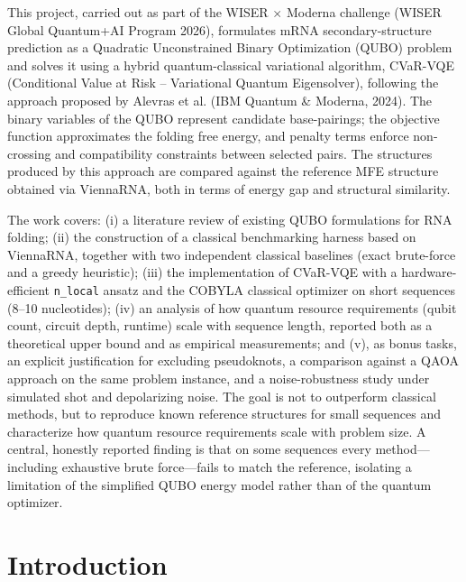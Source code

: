 \documentclass[11pt,a4paper]{article}
\begin{document}
	This project, carried out as part of the WISER $\times$ Moderna challenge (WISER Global Quantum+AI Program 2026), formulates mRNA secondary-structure prediction as a Quadratic Unconstrained Binary Optimization (QUBO) problem and solves it using a hybrid quantum-classical variational algorithm, CVaR-VQE (Conditional Value at Risk -- Variational Quantum Eigensolver), following the approach proposed by Alevras et al. (IBM Quantum \& Moderna, 2024). The binary variables of the QUBO represent candidate base-pairings; the objective function approximates the folding free energy, and penalty terms enforce non-crossing and compatibility constraints between selected pairs. The structures produced by this approach are compared against the reference MFE structure obtained via ViennaRNA, both in terms of energy gap and structural similarity.
	
	The work covers: (i) a literature review of existing QUBO formulations for RNA folding; (ii) the construction of a classical benchmarking harness based on ViennaRNA, together with two independent classical baselines (exact brute-force and a greedy heuristic); (iii) the implementation of CVaR-VQE with a hardware-efficient \texttt{n\_local} ansatz and the COBYLA classical optimizer on short sequences (8--10 nucleotides); (iv) an analysis of how quantum resource requirements (qubit count, circuit depth, runtime) scale with sequence length, reported both as a theoretical upper bound and as empirical measurements; and (v), as bonus tasks, an explicit justification for excluding pseudoknots, a comparison against a QAOA approach on the same problem instance, and a noise-robustness study under simulated shot and depolarizing noise. The goal is not to outperform classical methods, but to reproduce known reference structures for small sequences and characterize how quantum resource requirements scale with problem size. A central, honestly reported finding is that on some sequences every method---including exhaustive brute force---fails to match the reference, isolating a limitation of the simplified QUBO energy model rather than of the quantum optimizer.
	
	\vspace{0.3cm}

	
	\clearpage
	
	\section{Introduction}
	
\end{document}
